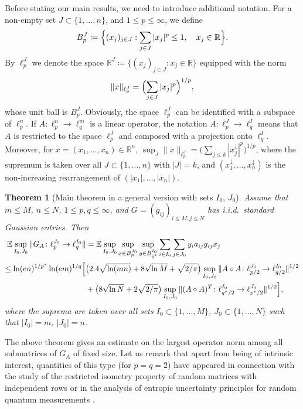 \documentclass[a4paper]{amsart}
\newtheorem{theorem}{Theorem}[section]
\theoremstyle{definition}
\theoremstyle{remark}
\numberwithin{equation}{section}
\newcommand*{\RR}{\mathbb{R}}
\newcommand*{\EE}{\mathbb{E}}
\newcommand*{\hadprod}{\mathbin{\circ}} %
\newcommand*{\rearr}{\downarrow} %
\begin{document}
Before stating our main results, we need to introduce additional  notation.
	For a non-empty set $J\subset \{1,\ldots,n\}$, and $1\leq p\leq \infty$, we define
	\[
		B_p^J\coloneqq \Bigl\{(x_j)_{j\in J}: \sum_{j\in J}|x_j|^p \le 1, \quad x_j\in \RR \Bigr\}.
	\]
	By	$\ell_p^J$ we denote the space $\RR^J\coloneqq \bigl\{(x_j)_{j\in J}: x_j\in \RR \bigr\}$ equipped with the norm
	\[
		\|x\|_{\ell_p^J} = \Bigl(\sum_{j\in J}|x_j|^p \Bigr)^{1/p},
	\]
	whose  unit ball is $B_p^J$.
Obviously, the space $\ell_p^J$ can be identified with a subspace of $\ell_p^n$.
 If  $A\colon \ell_p^n\to \ell_q^m$ is a linear operator, the notation $A\colon \ell_p^J\to \ell_q^I$ means that $A$ is restricted to the space $\ell_p^J$ and composed with a projection onto $\ell_q^I$.
Moreover, for $x=(x_1,\ldots, x_n)\in \RR^n$, $\sup_{J} \|x\|_{\ell_p^J} = \bigl(\sum_{j\le k} |x_j^{\rearr{}}|^p\bigr)^{1/p}$,
 where the supremum is taken over all $J\subset \{1,\ldots,n\}$ with $|J|=k$, and $(x_1^{\rearr{}}, \ldots,x_n^{\rearr{}})$
  is the non-increasing rearrangement of $(|x_1|,\ldots, |x_n|)$.



\begin{theorem}[Main theorem in a general version with sets $ I_0$, $J_0$]
\label{thm:main-gauss-sets}
	Assume that $m\le M$, $n\le N$, $1\leq p,q \leq \infty$, and $G=(g_{ij})_{i\leq M, j\leq N}$ has i.i.d.\ standard Gaussian entries. Then
 \begin{align*}
 \MoveEqLeft[10]
 \EE \sup_{I_0, J_0} \|G_A\colon \ell_p^{J_0} \to \ell_q^{I_0} \|
 =\EE \sup_{I_0, J_0} \sup_{x\in B_p^ {J_0}} \sup_{y\in B_{q^*}^ {I_0}} \sum_{i\in I_0} \sum_{j\in J_0} y_i a_{ij}g_{ij}x_j \\
 \leq \ln(en)^{1/p^*}  \ln(em)^{1/q}
 \Bigl[
 &\bigl( 2.4 \sqrt{\ln(mn)}+ 8 \sqrt{\ln M} + \sqrt{2/\pi}\bigr)
 \sup_{I_0,J_0} \|A\hadprod A \colon \ell^ {J_0}_{p/2} \to \ell^{ I_0}_{q/2}\|^{1/2}\\
& +\bigl(8\sqrt{\ln N } + 2\sqrt{2/\pi} \bigr)
 \sup_{I_0,J_0} \|(A\hadprod A)^T \colon \ell^{ I_0}_{q^*/2} \to \ell^ {J_0}_{p^*/2}\|^{1/2}
 \Bigr],
 \end{align*}
 where the suprema are taken over all sets $I_0\subset \{1,\ldots,M\}$, $J_0\subset \{1,\ldots,N\}$ such that $|I_0|=m$, $|J_0|=n$.
 \end{theorem}

The above theorem gives an estimate on the largest operator norm among all submatrices of $G_A$ of fixed size. Let us remark that apart from being of intrinsic interest, quantities of this type (for $p=q=2$) have appeared in connection with the study of the restricted isometry property of random matrices with independent rows \cite{MR2949869} or in the analysis of entropic uncertainty principles for random quantum measurements \cite{MR3478525, MR3081910}.
\end{document}
